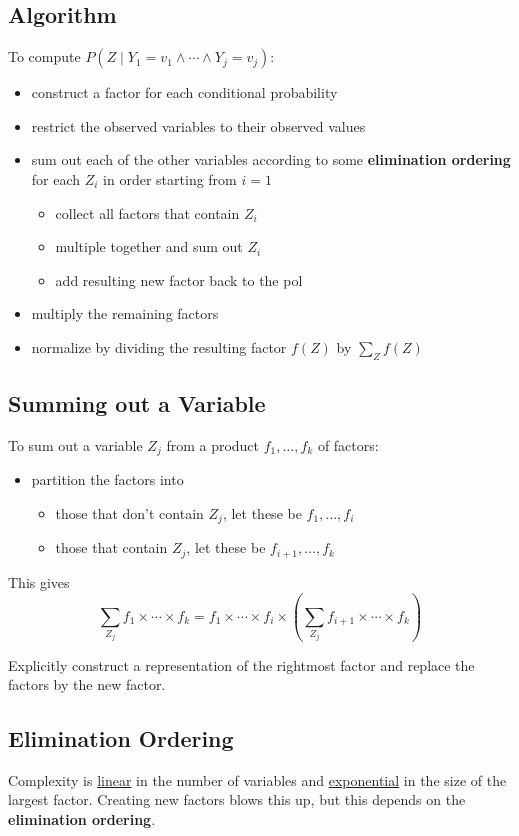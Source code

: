\documentclass[11pt]{article}
\begin{document}
\subsection{Algorithm}
\label{sec:org291b06b}
To compute \(P(Z \mid Y_{1} = v_{1} \wedge \cdots \wedge Y_{j} = v_{j})\):
\begin{itemize}
\item construct a factor for each conditional probability
\item restrict the observed variables to their observed values
\item sum out each of the other variables according to some \textbf{elimination ordering} for
each \(Z_{i}\) in order starting from \(i = 1\)
\begin{itemize}
\item collect all factors that contain \(Z_{i}\)
\item multiple together and sum out \(Z_{i}\)
\item add resulting new factor back to the pol
\end{itemize}
\item multiply the remaining factors
\item normalize by dividing the resulting factor \(f(Z)\) by \(\sum_{Z} f(Z)\)
\end{itemize}
\subsection{Summing out a Variable}
\label{sec:org8897709}
To sum out a variable \(Z_{j}\) from a product \(f_{1}, \dots, f_{k}\) of factors:
\begin{itemize}
\item partition the factors into
\begin{itemize}
\item those that don't contain \(Z_{j}\), let these be \(f_{1}, \dots, f_{i}\)
\item those that contain \(Z_{j}\), let these be \(f_{i+1}, \dots, f_{k}\)
\end{itemize}
\end{itemize}

This gives
$$ \sum_{Z_{j}} f_{1} \times \cdots \times f_{k} = f_{1} \times \cdots \times f_{i} \times \left( \sum_{Z_{j}} f_{i+1} \times \cdots \times f_{k} \right) $$

Explicitly construct a representation of the rightmost factor and replace
the factors by the new factor.
\subsection{Elimination Ordering}
\label{sec:orga2001c0}
Complexity is \uline{linear} in the number of variables and \uline{exponential} in the size of the largest
factor.
Creating new factors blows this up, but this depends on the \textbf{elimination ordering}.
\end{document}
